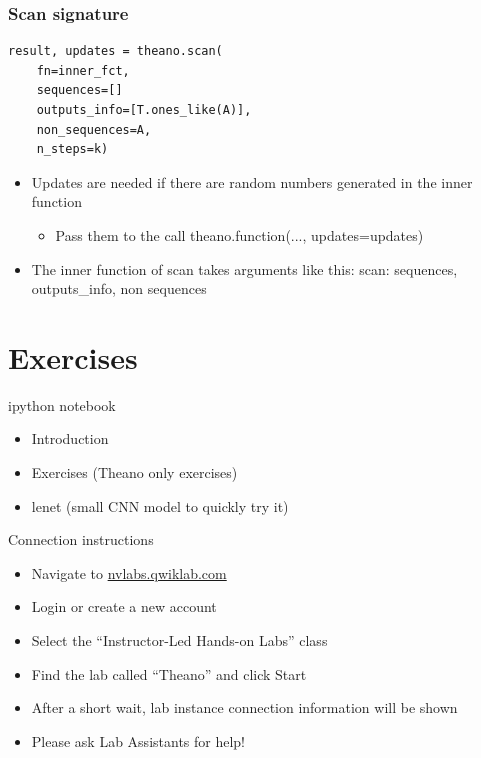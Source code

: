 \documentclass[utf8x,xcolor=pdftex,dvipsnames,table]{beamer}
\begin{document}
\begin{frame}[fragile]
  \frametitle{Scan signature}

\begin{lstlisting}
result, updates = theano.scan(
    fn=inner_fct,
    sequences=[]
    outputs_info=[T.ones_like(A)],
    non_sequences=A,
    n_steps=k)
\end{lstlisting}

\begin{itemize}
\item Updates are needed if there are random numbers generated in the inner function
\begin{itemize}
\item Pass them to the call theano.function(..., updates=updates)
\end{itemize}
\item The inner function of scan takes arguments like this:
   scan: sequences, outputs\_info, non sequences
\end{itemize}

\end{frame}
\fi

\section{Exercises}
\begin{frame}
  \tableofcontents[currentsection]
\end{frame}

\begin{frame}{ipython notebook}
\begin{itemize}
\item Introduction
\item Exercises (Theano only exercises)
\item lenet (small CNN model to quickly try it)
\end{itemize}
\end{frame}


\begin{frame}{Connection instructions}
\begin{itemize}
\item Navigate to \url{nvlabs.qwiklab.com}
\item Login or create a new account
\item Select the ``Instructor-Led Hands-on Labs'' class
\item Find the lab called ``Theano'' and click Start
\item After a short wait, lab instance connection information will be shown
\item Please ask Lab Assistants for help!
\end{itemize}
\end{frame}
\end{document}
